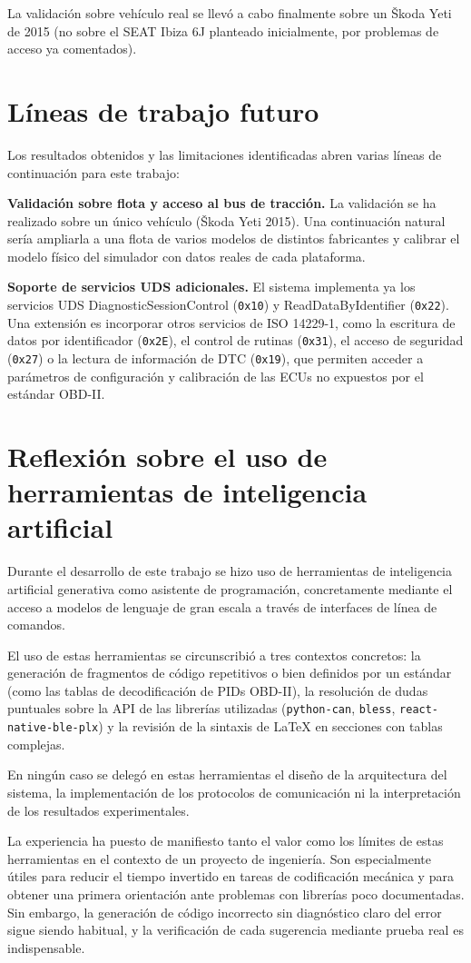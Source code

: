 La validación sobre vehículo real se llevó a cabo finalmente sobre un Škoda Yeti de 2015 (no sobre el SEAT Ibiza 6J planteado inicialmente, por problemas de acceso ya comentados).


\section{Líneas de trabajo futuro}
\label{sec:trabajo_futuro}

Los resultados obtenidos y las limitaciones identificadas abren varias líneas de continuación para este trabajo:

\textbf{Validación sobre flota y acceso al bus de tracción.} La validación se ha realizado sobre un único vehículo (Škoda Yeti 2015). Una continuación natural sería ampliarla a una flota de varios modelos de distintos fabricantes y calibrar el modelo físico del simulador con datos reales de cada plataforma.

\textbf{Soporte de servicios UDS adicionales.} El sistema implementa ya los servicios UDS DiagnosticSessionControl (\texttt{0x10}) y ReadDataByIdentifier (\texttt{0x22}). Una extensión es incorporar otros servicios de ISO 14229-1, como la escritura de datos por identificador (\texttt{0x2E}), el control de rutinas (\texttt{0x31}), el acceso de seguridad (\texttt{0x27}) o la lectura de información de DTC (\texttt{0x19}), que permiten acceder a parámetros de configuración y calibración de las ECUs no expuestos por el estándar OBD-II.



\section{Reflexión sobre el uso de herramientas de inteligencia artificial}
\label{sec:uso_ia}

Durante el desarrollo de este trabajo se hizo uso de herramientas de inteligencia artificial generativa como asistente de programación, concretamente mediante el acceso a modelos de lenguaje de gran escala a través de interfaces de línea de comandos.

El uso de estas herramientas se circunscribió a tres contextos concretos: la generación de fragmentos de código repetitivos o bien definidos por un estándar (como las tablas de decodificación de PIDs OBD-II), la resolución de dudas puntuales sobre la API de las librerías utilizadas (\texttt{python-can}, \texttt{bless}, \texttt{react-native-ble-plx}) y la revisión de la sintaxis de LaTeX en secciones con tablas complejas.

En ningún caso se delegó en estas herramientas el diseño de la arquitectura del sistema, la implementación de los protocolos de comunicación ni la interpretación de los resultados experimentales.

La experiencia ha puesto de manifiesto tanto el valor como los límites de estas herramientas en el contexto de un proyecto de ingeniería. Son especialmente útiles para reducir el tiempo invertido en tareas de codificación mecánica y para obtener una primera orientación ante problemas con librerías poco documentadas. Sin embargo, la generación de código incorrecto sin diagnóstico claro del error sigue siendo habitual, y la verificación de cada sugerencia mediante prueba real es indispensable.